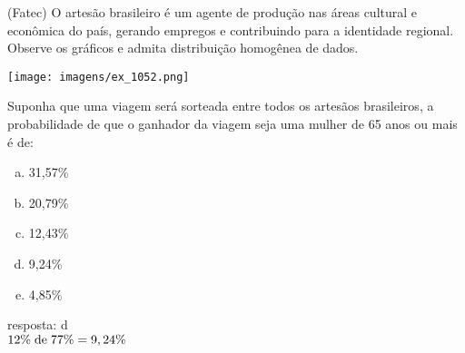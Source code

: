 \begin{ex}
   (Fatec) O artesão brasileiro é um agente de produção nas áreas cultural e econômica do país, gerando empregos e contribuindo para a identidade regional. Observe os gráficos e admita distribuição homogênea de dados. 
     \begin{center}
         \texttt{[image: imagens/ex\_1052.png]}
     \end{center}
  Suponha que uma viagem será sorteada entre todos os artesãos brasileiros, a probabilidade de que o ganhador da viagem seja uma mulher de 65 anos ou mais é de:
    \begin{enumerate} [(a)]
        \item 31,57\%
        \item 20,79\%
        \item 12,43\%
        \item 9,24\%
        \item 4,85\%
    \end{enumerate}
      \begin{sol}
      resposta: d \\
      $12\%\hspace{0,1cm} \text{de}\hspace{0,1cm}  77\%=9,24\%$
      \end{sol}
  \end{ex}